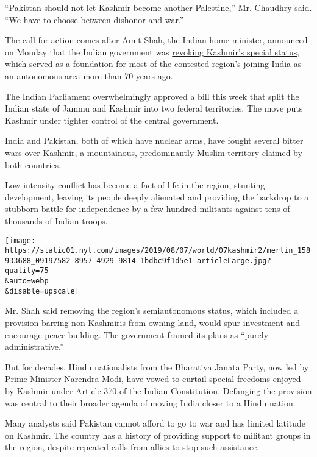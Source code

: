 ``Pakistan should not let Kashmir become another Palestine,'' Mr.
Chaudhry said. ``We have to choose between dishonor and war.''

The call for action comes after Amit Shah, the Indian home minister,
announced on Monday that the Indian government was
\href{https://www.nytimes.com/2019/08/05/world/asia/india-pakistan-kashmir-jammu.html?rref=collection\%2Fbyline\%2Fkai-schultz}{revoking
Kashmir's special status}, which served as a foundation for most of the
contested region's joining India as an autonomous area more than 70
years ago.

The Indian Parliament overwhelmingly approved a bill this week that
split the Indian state of Jammu and Kashmir into two federal
territories. The move puts Kashmir under tighter control of the central
government.

India and Pakistan, both of which have nuclear arms, have fought several
bitter wars over Kashmir, a mountainous, predominantly Muslim territory
claimed by both countries.

Low-intensity conflict has become a fact of life in the region, stunting
development, leaving its people deeply alienated and providing the
backdrop to a stubborn battle for independence by a few hundred
militants against tens of thousands of Indian troops.

\texttt{[image: https://static01.nyt.com/images/2019/08/07/world/07kashmir2/merlin\_158933688\_09197582-8957-4929-9814-1bdbc9f1d5e1-articleLarge.jpg?quality=75\\\&auto=webp\\\&disable=upscale]}

Mr. Shah said removing the region's semiautonomous status, which
included a provision barring non-Kashmiris from owning land, would spur
investment and encourage peace building. The government framed its plans
as ``purely administrative.''

But for decades, Hindu nationalists from the Bharatiya Janata Party, now
led by Prime Minister Narendra Modi, have
\href{https://www.nytimes.com/2019/08/06/world/asia/jammu-kashmir-india.html?rref=collection\%2Fbyline\%2Fkai-schultz}{vowed
to curtail special freedoms} enjoyed by Kashmir under Article 370 of the
Indian Constitution. Defanging the provision was central to their
broader agenda of moving India closer to a Hindu nation.

Many analysts said Pakistan cannot afford to go to war and has limited
latitude on Kashmir. The country has a history of providing support to
militant groups in the region, despite repeated calls from allies to
stop such assistance.

